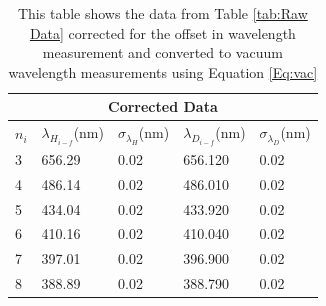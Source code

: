 \documentclass[%
 aps,%
 pra,%
 preprint, %
 amsmath, %
 amsfonts, %
 amssymb, %
]{revtex4-2}
\begin{document}
\begin{table}[h!]
\begin{tabular}{lllll}
\hline
\hline
\multicolumn{5}{c}{Corrected Data}                                                                                                                                                             \\ \hline
\multicolumn{1}{l|}{$n_i$} & \multicolumn{1}{l|}{$\lambda_{H_{i-f}}$(nm)} & \multicolumn{1}{l|}{$\sigma_{\lambda_H}$(nm)} & \multicolumn{1}{l|}{$\lambda_{D_{i-f}}$(nm)} & $\sigma_{\lambda_D}$(nm) \\
\hline
\multicolumn{1}{l|}{3}     & \multicolumn{1}{l|}{656.29}                & \multicolumn{1}{l|}{0.02}                    & \multicolumn{1}{l|}{656.120}                & 0.02                   \\
\multicolumn{1}{l|}{4}     & \multicolumn{1}{l|}{486.14}                & \multicolumn{1}{l|}{0.02}                    & \multicolumn{1}{l|}{486.010}                & 0.02                   \\
\multicolumn{1}{l|}{5}     & \multicolumn{1}{l|}{434.04}                & \multicolumn{1}{l|}{0.02}                    & \multicolumn{1}{l|}{433.920}                & 0.02                   \\
\multicolumn{1}{l|}{6}     & \multicolumn{1}{l|}{410.16}                & \multicolumn{1}{l|}{0.02}                    & \multicolumn{1}{l|}{410.040}                & 0.02                   \\
\multicolumn{1}{l|}{7}     & \multicolumn{1}{l|}{397.01}                & \multicolumn{1}{l|}{0.02}                    & \multicolumn{1}{l|}{396.900}                & 0.02                   \\
\multicolumn{1}{l|}{8}     & \multicolumn{1}{l|}{388.89}                & \multicolumn{1}{l|}{0.02}                    & \multicolumn{1}{l|}{388.790}                & 0.02          \\
\hline
\hline
\end{tabular}
\caption{
This table shows the data from Table \ref{tab:Raw Data} corrected for the offset in wavelength measurement and converted to vacuum wavelength measurements using Equation \ref{Eq:vac}}
\label{tab:corrected}
\end{table}
\newpage
\end{document}
